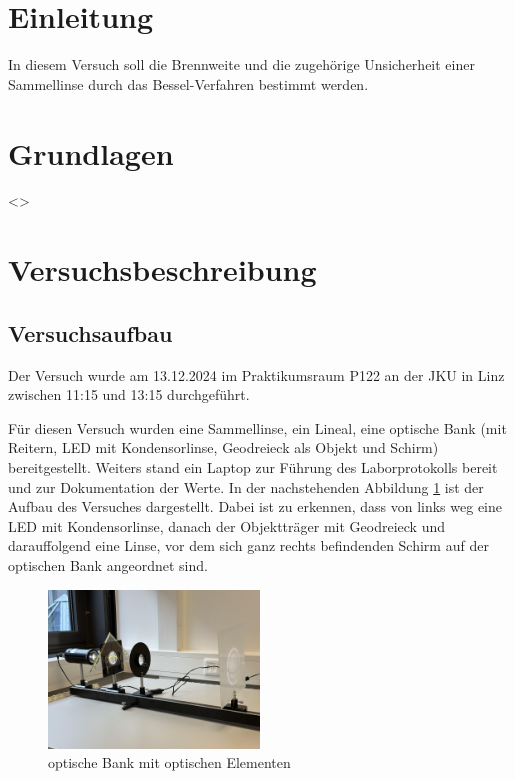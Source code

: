 \documentclass[a4paper,12pt]{article}
\begin{document}
\tableofcontents
\newpage


\section{Einleitung}

In diesem Versuch soll die Brennweite und die zugehörige Unsicherheit einer Sammellinse durch 
das Bessel-Verfahren bestimmt werden.

\section{Grundlagen}

<>

\section{Versuchsbeschreibung}
\subsection{Versuchsaufbau}

Der Versuch wurde am 13.12.2024 im Praktikumsraum P122 an der JKU in Linz zwischen 11:15 und
13:15 durchgeführt.

Für diesen Versuch wurden eine Sammellinse, ein Lineal, eine optische Bank (mit Reitern, LED
mit Kondensorlinse, Geodreieck als Objekt und Schirm) bereitgestellt.
Weiters stand ein Laptop zur Führung des Laborprotokolls bereit und zur Dokumentation der Werte.
In der nachstehenden Abbildung \ref{Abb:Versuchsaufbau1} ist der Aufbau des Versuches dargestellt.
Dabei ist zu erkennen, dass von links weg eine LED mit Kondensorlinse, danach der Objektträger
mit Geodreieck und darauffolgend eine Linse, vor dem sich ganz rechts befindenden Schirm auf der
optischen Bank angeordnet sind.

\begin{figure}[H]
    \centering
    \includegraphics[width=0.5\textwidth]{bilder/Versuchsaufbau1.jpg}           %
    \caption{optische Bank mit optischen Elementen}                             %
    \label{Abb:Versuchsaufbau1}
\end{figure}
\end{document}
